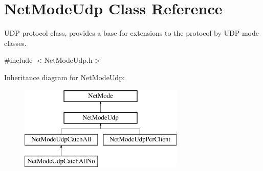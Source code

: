 \hypertarget{class_net_mode_udp}{
\section{NetModeUdp Class Reference}
\label{class_net_mode_udp}
}


UDP protocol class, provides a base for extensions to the protocol by UDP mode classes.  




{\ttfamily \#include $<$NetModeUdp.h$>$}

Inheritance diagram for NetModeUdp:\begin{figure}[H]
\begin{center}
\leavevmode
\includegraphics[height=4.000000cm]{class_net_mode_udp}
\end{center}
\end{figure}

